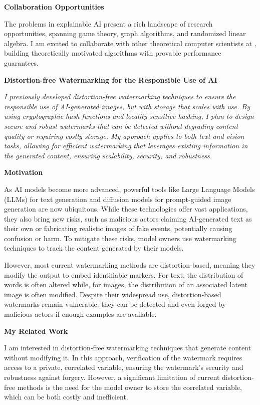 \documentclass[11pt]{article}
\begin{document}
{{ \large \textbf{Collaboration Opportunities}}

The problems in explainable AI present a rich landscape of research opportunities, spanning game theory, graph algorithms, and randomized linear algebra.
I am excited to collaborate with other theoretical computer scientists at \school, building theoretically motivated algorithms with provable performance guarantees.

\begin{center}
{ \large \textbf{Distortion-free Watermarking for the Responsible Use of AI}}
\end{center}

\textit{I previously developed distortion-free watermarking techniques to ensure the responsible use of AI-generated images, but with storage that scales with use. By using cryptographic hash functions and locality-sensitive hashing, I plan to design secure and robust watermarks that can be detected without degrading content quality or requiring costly storage. My approach applies to both text and vision tasks, allowing for efficient watermarking that leverages existing information in the generated content, ensuring scalability, security, and robustness.}

{ \large \textbf{Motivation}}

As AI models become more advanced, powerful tools like Large Language Models (LLMs) for text generation and diffusion models for prompt-guided image generation are now ubiquitous. While these technologies offer vast applications, they also bring new risks, such as malicious actors claiming AI-generated text as their own or fabricating realistic images of fake events, potentially causing confusion or harm. To mitigate these risks, model owners use watermarking techniques to track the content generated by their models.

However, most current watermarking methods are distortion-based, meaning they modify the output to embed identifiable markers. For text, the distribution of words is often altered while, for images, the distribution of an associated latent image is often modified. Despite their widespread use, distortion-based watermarks remain vulnerable: they can be detected and even forged by malicious actors if enough examples are available.

{ \large \textbf{My Related Work}}

I am interested in distortion-free watermarking techniques that generate content without modifying it. In this approach, verification of the watermark requires access to a private, correlated variable, ensuring the watermark's security and robustness against forgery. However, a significant limitation of current distortion-free methods is the need for the model owner to store the correlated variable, which can be both costly and inefficient.

}
\end{document}

